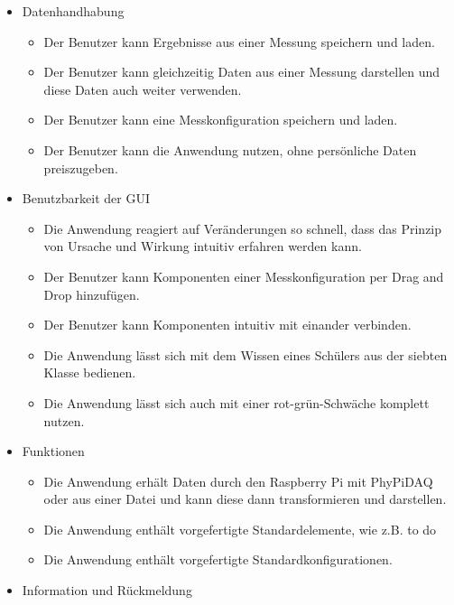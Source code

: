 \documentclass[parskip=full]{scrartcl}
\begin{document}
\begin{itemize}

\item Datenhandhabung
\begin{itemize}

\item Der Benutzer kann Ergebnisse aus einer Messung speichern und laden.
\item Der Benutzer kann gleichzeitig Daten aus einer Messung darstellen und diese Daten auch weiter verwenden.
\item Der Benutzer kann eine Messkonfiguration speichern und laden.
\item Der Benutzer kann die Anwendung nutzen, ohne persönliche Daten preiszugeben.

\end{itemize}



\item Benutzbarkeit der GUI
\begin{itemize}

\item Die Anwendung reagiert auf Veränderungen so schnell, dass das Prinzip von Ursache und Wirkung intuitiv erfahren werden kann.
\item Der Benutzer kann Komponenten einer Messkonfiguration per Drag and Drop hinzufügen.
\item Der Benutzer kann Komponenten intuitiv mit einander verbinden.
\item Die Anwendung lässt sich mit dem Wissen eines Schülers aus der siebten Klasse bedienen.
\item Die Anwendung lässt sich auch mit einer rot-grün-Schwäche komplett nutzen.

\end{itemize}

\item Funktionen
\begin{itemize}

\item Die Anwendung erhält Daten durch den Raspberry Pi mit PhyPiDAQ oder aus einer Datei und kann diese dann transformieren und darstellen.
\item Die Anwendung enthält vorgefertigte Standardelemente, wie z.B. to do
\item Die Anwendung enthält vorgefertigte Standardkonfigurationen.

\end{itemize}

\item Information und Rückmeldung
\begin{itemize}


\end{itemize}
\end{itemize}
\end{document}
